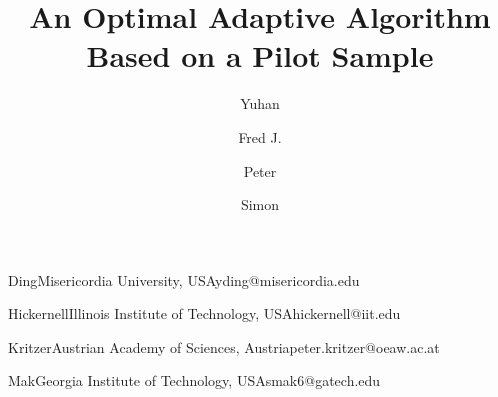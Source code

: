 % 
%

%
\title{An Optimal Adaptive Algorithm Based on a Pilot Sample}

\author{Yuhan}{Ding}{Misericordia University, USA}{yding@misericordia.edu}
\author{Fred J.}{Hickernell}{Illinois Institute of Technology, USA}{hickernell@iit.edu}
\author{Peter}{Kritzer}{Austrian Academy of Sciences, Austria}{peter.kritzer@oeaw.ac.at}
\author{Simon}{Mak}{Georgia Institute of Technology, USA}{smak6@gatech.edu}


